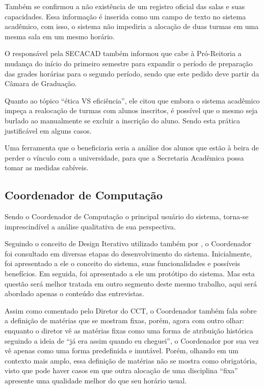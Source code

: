 Também se confirmou a não existência de um registro oficial das salas e suas capacidades. Essa informação é inserida como um campo de texto no sistema acadêmico, com isso, o sistema não impediria a alocação de duas turmas em uma mesma sala em um mesmo horário.

O responsável pela SECACAD também informou que cabe à Pró-Reitoria a mudança do início do primeiro semestre para expandir o período de preparação das grades horárias para o segundo período, sendo que este pedido deve partir da Câmara de Graduação.

Quanto ao tópico ``ética VS eficiência'', ele citou que embora o sistema acadêmico impeça a realocação de turmas com alunos inscritos, é possível que o mesmo seja burlado ao manualmente se excluir a inscrição do aluno. Sendo esta prática justificável em alguns casos.

Uma ferramenta que o beneficiaria seria a análise dos alunos que estão à beira de perder o vínculo com a universidade, para que a Secretaria Acadêmica possa tomar as medidas cabíveis.

\subsection{Coordenador de Computação} \label{subsec:3_Coordenador} %

Sendo o Coordenador de Computação o principal usuário do sistema, torna-se imprescindível a análise qualitativa de sua perspectiva.

Seguindo o conceito de Design Iterativo utilizado também por , o Coordenador foi consultado em diversas etapas do desenvolvimento do sistema. Inicialmente, foi apresentado a ele o conceito do sistema, suas funcionalidades e possíveis benefícios. Em seguida, foi apresentado a ele um protótipo do sistema. Mas esta questão será melhor tratada em outro segmento deste mesmo trabalho, aqui será abordado apenas o conteúdo das entrevistas.

Assim como comentado pelo Diretor do CCT, o Coordenador também fala sobre a definição de matérias que se mostram fixas, porém, agora com outro olhar: enquanto o diretor vê as matérias fixas como uma forma de atribuição histórica seguindo a ideia de ``já era assim quando eu cheguei'', o Coordenador por sua vez vê apenas como uma forma predefinida e imutável. Porém, olhando em um contexto mais amplo, essa definição de matérias não se mostra como obrigatória, visto que pode haver casos em que outra alocação de uma disciplina ``fixa'' apresente uma qualidade melhor do que seu horário usual.

